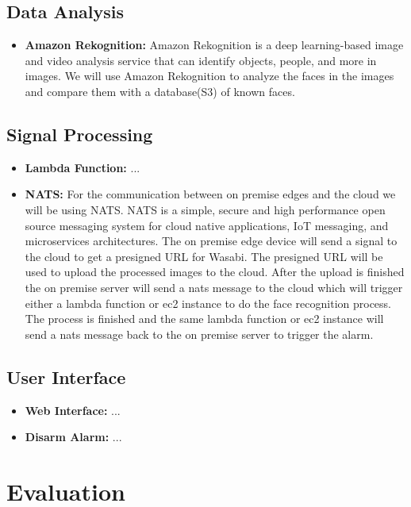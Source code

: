 \documentclass[conference]{IEEEtran}
\begin{document}
\subsection{Data Analysis}
\begin{itemize}
      \item \textbf{Amazon Rekognition:} Amazon Rekognition is a deep learning-based image and video analysis service that can identify objects, people, and more in images.
            We will use Amazon Rekognition to analyze the faces in the images and compare them with a database(S3) of known faces.
\end{itemize}
\subsection{Signal Processing}
\begin{itemize}
      \item \textbf{Lambda Function:} ...
      \item \textbf{NATS:} For the communication between on premise edges and the cloud we will be using NATS. NATS is a simple, secure and high performance open source messaging system for cloud native applications, IoT messaging, and microservices architectures.
            The on premise edge device will send a signal to the cloud to get a presigned URL for Wasabi. The presigned URL will be used to upload the processed images to the cloud.
            After the upload is finished the on premise server will send a nats message to the cloud which will trigger either a lambda function or ec2 instance to do the face recognition process.
            The process is finished and the same lambda function or ec2 instance will send a nats message back to the on premise server to trigger the alarm.
\end{itemize}
\subsection{User Interface}
\begin{itemize}
      \item \textbf{Web Interface:} ...
      \item \textbf{Disarm Alarm:} ...
\end{itemize}

\section{Evaluation}
\label{sec:evaluation}
\end{document}
